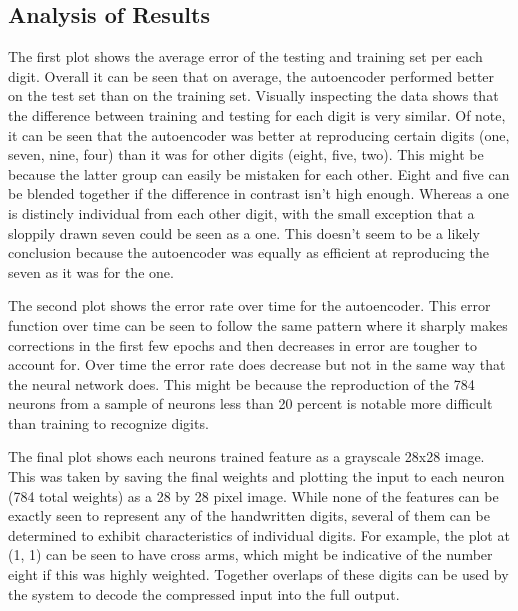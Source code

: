 \documentclass[12pt, letterpaper, twoside]{article}
\begin{document}
\subsection{Analysis of Results}

The first plot shows the average error of the testing and training set per each digit.
Overall it can be seen that on average, the autoencoder performed better on the test set 
than on the training set. Visually inspecting the data shows that the difference between
training and testing for each digit is very similar. Of note, it can be seen that the 
autoencoder was better at reproducing certain digits (one, seven, nine, four) than it was 
for other digits (eight, five, two). This might be because the latter group can easily be 
mistaken for each other. Eight and five can be blended together if the difference in contrast
isn't high enough. Whereas a one is distincly individual from each other digit, with the
small exception that a sloppily drawn seven could be seen as a one. This doesn't seem to be 
a likely conclusion because the autoencoder was equally as efficient at reproducing the seven
as it was for the one. 

The second plot shows the error rate over time for the autoencoder. This error function over 
time can be seen to follow the same pattern where it sharply makes corrections in the first
few epochs and then decreases in error are tougher to account for. Over time the error rate
does decrease but not in the same way that the neural network does. This might be because the
reproduction of the 784 neurons from a sample of neurons less than 20 percent is notable more 
difficult than training to recognize digits. 

The final plot shows each neurons trained feature as a grayscale 28x28 image. This was taken
by saving the final weights and plotting the input to each neuron (784 total weights) as a 
28 by 28 pixel image. While none of the features can be exactly seen to represent any of the
handwritten digits, several of them can be determined to exhibit characteristics of individual
digits. For example, the plot at (1, 1) can be seen to have cross arms, which might be indicative
of the number eight if this was highly weighted. Together overlaps of these digits can be used by
the system to decode the compressed input into the full output. 
\end{document}
